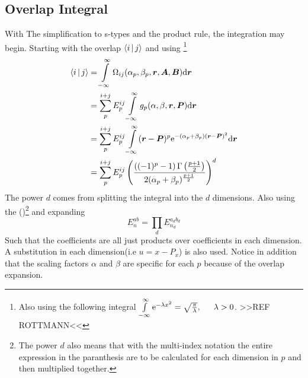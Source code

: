 \subsection{Overlap Integral\label{susec:overlapIntegral}}
    With The simplification to s-types and the product rule, the integration
    may begin. Starting with the overlap $\Braket{i|j}$ and using
    \footnote{Also using the following integral $\infint
    \me^{-\lambda x^2} = \sqrt{\frac{\pi}{\lambda}},\indent \lambda>0$. >>REF
    ROTTMANN<<}
        \begin{align}
            \Braket{i|j} &= \int\limits^{\infty}_{-\infty}
            \Omega_{ij}(\alpha_p,\beta_p,\boldsymbol{{r}},\boldsymbol{{A}},\boldsymbol{{B}}) \mathrm{d}
            \boldsymbol{{r}} \nonumber \\
            &= \sum\limits^{i+j}_{p} E^{ij}_{p} \int\limits^{\infty}_{-\infty} g_p(\alpha,\beta,\boldsymbol{{r}},\boldsymbol{{P}})
            \mathrm{d}\boldsymbol{{r}} \nonumber \\
            &= \sum\limits^{i+j}_{p} E^{ij}_{p} \int\limits^{\infty}_{-\infty} (\boldsymbol{{r}}-\boldsymbol{{P}})^p \mathrm{e}^{-(\alpha_p +
            \beta_p)(\boldsymbol{{r}} - \boldsymbol{{P}})^2} \mathrm{d}\boldsymbol{{r}} \nonumber \\
            &= \sum\limits^{i+j}_{p} E^{ij}_{p}
            \left(\frac{\left((-1)^p-1\right)\Gamma\left(\frac{p+1}{2}\right)}
            {2(\alpha_p+\beta_p)^{\frac{p+1}{2}}}\right)^d
            \label{eq:stypeOverlap}
        \end{align}
    The power $d$ comes from splitting the integral into the $d$ dimensions.
    Also using the ()\footnote{The power $d$ also means
    that with the multi-index notation the entire expression in the paranthesis
    are to be calculated for each dimension in $p$ and then multiplied
    together.} and expanding
        \begin{equation}
            E^{ab}_{n} = \prod_d E^{a_db_d}_{n_d}
            \label{eq:Enotation}
        \end{equation}
    Such that the coefficients are all just products over coefficients in each
    dimension. A substitution in each dimension(i.e $u=x-P_x$) is also used.
    Notice in addition that the scaling factors $\alpha$ and $\beta$ are
    specific for each $p$ because of the overlap expansion.

